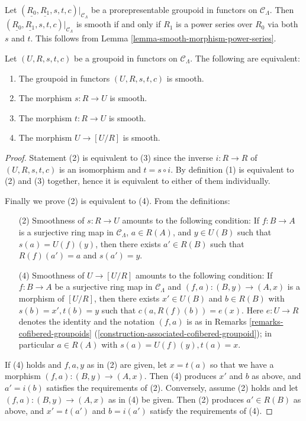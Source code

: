 \begin{remark}
Let $(\underline{R_0}, \underline{R_1}, s,t,c)|_{\mathcal C_{\Lambda}}$ be a 
prorepresentable groupoid in functors on $\mathcal C_{\Lambda}$.  Then 
$(\underline{R_0}, \underline{R_1}, s,t,c)|_{\mathcal C_{\Lambda}}$ is smooth 
if and only if $R_1$ is a power series over $R_0$ via both $s$ and $t$.  This 
follows from Lemma \ref{lemma-smooth-morphism-power-series}.
\end{remark}

\begin{lemma}
\label{lemma-smooth-quotient-morphism}
Let $(U, R, s,t,c)$ be a groupoid in functors on $\mathcal C_{\Lambda}$.  The 
following are equivalent: 
\begin{enumerate}
\item The groupoid in functors $(U, R, s,t,c)$ is smooth.
\item The morphism $s: R \rightarrow U$ is smooth.
\item The morphism $t: R \rightarrow U$ is smooth.
\item The morphism $U \rightarrow [U/R]$ is smooth.
\end{enumerate}
\end{lemma}

\begin{proof}
Statement (2) is equivalent to (3) since the inverse $i: R \rightarrow R$ of 
$(U, R, s,t,c)$ is an isomorphism and $t = s \circ i$. By definition (1) is 
equivalent to (2) and (3) together, hence it is equivalent to either of them 
individually. 

\medskip \noindent
Finally we prove (2) is equivalent to (4). From the definitions:
\begin{enumerate}
\item[(2)] Smoothness of $s: R \rightarrow U$ amounts to the following 
condition: If $f: B \rightarrow A$ is a surjective ring map in $\mathcal 
C_{\Lambda}$, $a \in R(A)$, and $y \in U(B)$ such that $s(a) = U(f)(y)$, then 
there exists $a' \in R(B)$ such that $R(f)(a') = a$ and $s(a') = y$.

\item[(4)] Smoothness of $U \rightarrow [U/R]$ amounts to the following 
condition: If $f: B \rightarrow A$ be a surjective ring map in $\mathcal 
C_{\Lambda}$ and $(f,a): (B,y) \rightarrow (A,x)$ is a morphism of $[U/R]$, 
then there exists $x' \in U(B)$ and $b \in R(B)$ with $s(b) = x', t(b) = y$ 
such that $c(a,R(f)(b)) = e(x)$.  Here $e: U \rightarrow R$ denotes the 
identity and the notation $(f,a)$ is as in Remarks 
\ref{remarks-cofibered-groupoids} 
(\ref{construction-associated-cofibered-groupoid}); in particular $a \in R(A)$ 
with $s(a) = U(f)(y), t(a) = x$.  
\end{enumerate}
If (4) holds and $f,a,y$ as in (2) are given, let $x = t(a)$ so that we have a 
morphism $(f,a): (B,y) \rightarrow (A,x)$.  Then (4) produces $x'$ and $b$ as 
above, and $a' = i(b)$ satisfies the requirements of (2).  Conversely, assume 
(2) holds and let $(f,a): (B,y) \rightarrow (A,x)$ as in (4) be given.  Then 
(2) produces $a' \in R(B)$ as above, and $x' = t(a')$ and $b = i(a')$ satisfy 
the requirements of (4).
\end{proof}

